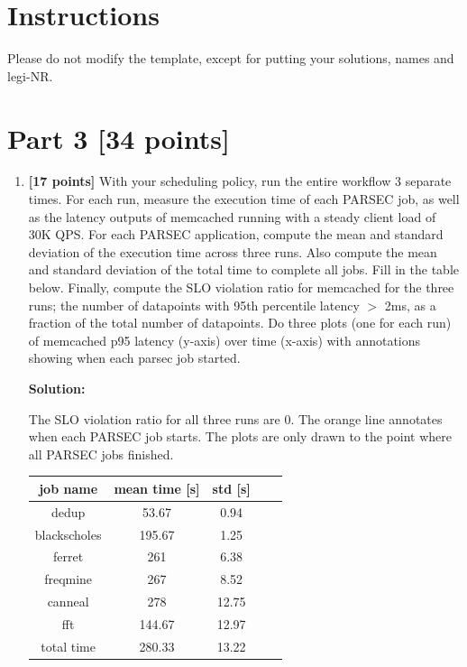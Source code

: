 \documentclass[11pt]{article}
\begin{document}

\section*{Instructions}
Please do not modify the template, except for putting your solutions, names and legi-NR.
\newpage
\section*{Part 3 [34 points]}
\begin{enumerate}
    \item \textbf{[17 points]} With your scheduling policy, run the entire workflow 3 separate times. For each run, measure the execution time of each PARSEC job, as well as the latency outputs of memcached running with a steady client load of 30K QPS. For each PARSEC application, compute the mean and standard deviation of the execution time across three runs. Also compute the mean and standard deviation of the total time to complete all jobs. Fill in the table below. Finally, compute the SLO violation ratio for memcached for the three runs; the number of datapoints with 95th percentile latency $>$ 2ms, as a fraction of the total number of datapoints.  Do three plots (one for each run) of memcached p95 latency (y-axis) over time (x-axis) with annotations showing when each parsec job started.
    
    \textbf{Solution:}
    
    The SLO violation ratio for all three runs are 0. The orange line annotates when each PARSEC job starts. The plots are only drawn to the point where all PARSEC jobs finished.
    
    \begin{table}[h]
\centering
\begin{tabular}{ |c|c|c|c|c|} 
\hline
job name & mean time [s] & std [s] \\ \hline \hline
dedup         & 53.67 & 0.94 \\  \hline
blackscholes  & 195.67 & 1.25\\  \hline
ferret        & 261 & 6.38 \\  \hline
freqmine      & 267 & 8.52 \\  \hline
canneal       & 278 & 12.75 \\  \hline
fft           & 144.67 & 12.97\\  \hline
total time    & 280.33 & 13.22\\ \hline
\end{tabular}
\end{table}
    

\end{enumerate}
\end{document}
